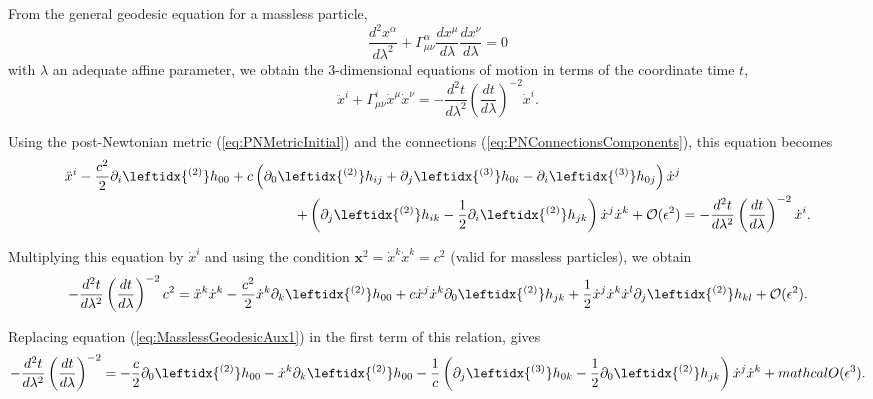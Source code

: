 From the general geodesic equation for a massless particle,
\begin{equation}
\frac{d^2 x^\alpha}{d\lambda ^2} + \Gamma^\alpha _{\mu \nu} \frac{dx^\mu}{d\lambda} \frac{dx^\nu}{d\lambda} = 0
\end{equation}
with $\lambda$ an adequate affine parameter, we obtain the 3-dimensional equations of motion in terms of the coordinate time $t$,
\begin{equation}
\ddot{x}^i + \Gamma^i _{\mu \nu} \dot{x}^\mu \dot{x}^\nu = - \frac{d^2 t}{d\lambda^2} \left( \frac{dt}{d\lambda} \right)^{-2} \dot{x}^i .
\end{equation}

Using the post-Newtonian metric (\ref{eq:PNMetricInitial}) and the connections (\ref{eq:PNConnectionsComponents}), this equation becomes
 \begin{align}
 \ddot{x}^i  - \frac{c^2}{2} \partial_i \leftidx{^{(2)}} h_{00} + c \left( \partial_0 \leftidx{^{(2)}} h_{ij} + \partial_j \leftidx{^{(3)}} h_{0i} - \partial_i \leftidx{^{(3)}} h_{0j} \right) \dot{x}^j & \notag \\
 + \left( \partial_j \leftidx{^{(2)}} h_{ik} - \frac{1}{2} \partial_i \leftidx{^{(2)}} h_{jk} \right) \dot{x}^j \dot{x}^k + \mathcal{O}(\epsilon^2) &= - \frac{d^2 t}{d\lambda^2} \left( \frac{dt}{d\lambda} \right)^{-2} \dot{x}^i. \label{eq:MasslessGeodesicAux2}
 \end{align}

Multiplying this equation by $\dot{x}^i$ and using the condition $\textbf{x}^2 = \dot{x}^k \dot{x}^k = c^2$ (valid for massless particles), we obtain
\begin{equation}
- \frac{d^2 t}{d\lambda^2} \left( \frac{dt}{d\lambda} \right)^{-2} c^2 =  \ddot{x}^k \dot{x}^k - \frac{c^2}{2} \dot{x}^k \partial_k \leftidx{^{(2)}} h_{00} + c \dot{x}^j \dot{x}^k \partial_0 \leftidx{^{(2)}} h_{jk}  + \frac{1}{2} \dot{x}^j \dot{x}^k \dot{x}^l \partial_j \leftidx{^{(2)}} h_{kl} + \mathcal{O}(\epsilon^2) .
\end{equation}

Replacing equation (\ref{eq:MasslessGeodesicAux1}) in the first term of this relation, gives
\begin{equation}
- \frac{d^2 t}{d\lambda^2} \left( \frac{dt}{d\lambda} \right)^{-2}  =  - \frac{c}{2}  \partial_0 \leftidx{^{(2)}} h_{00} - \dot{x}^k \partial_k \leftidx{^{(2)}} h_{00}  - \frac{1}{c} \left( \partial_j \leftidx{^{(3)}} h_{0k} - \frac{1}{2} \partial_0 \leftidx{^{(2)}} h_{jk}  \right) \dot{x}^j \dot{x}^k  + \\mathcal{O}(\epsilon^3) .
\end{equation}

